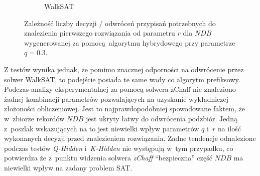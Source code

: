 \begin{figure}[!htb]
\begin{subfigure}{0.5\textwidth}
        \caption{WalkSAT}
        \label{chrt:r-hybrid-w}
    \end{subfigure}
    \caption{Zależność liczby decyzji / odwróceń przypisań potrzebnych do znalezienia pierwszego rozwiązania od parametru $r$ dla $NDB$ wygenerowanej za pomocą algorytmu hybrydowego przy parametrze $q=0.3$.}
\end{figure}

Z testów wynika jednak, że pomimo znacznej odporności na odwrócenie przez solwer WalkSAT, to podejście posiada te same wady co algorytm prefiksowy. Podczas analizy eksperymentalnej za pomocą solwera zChaff
nie znaleziono żadnej kombinacji parametrów pozwalających na uzyskanie wykładniczej złożoności obliczeniowej. Jest to najprawdopodobniej spowodowane faktem, że w~zbiorze rekordów $NDB$ jest ukryty łatwy do odwrócenia podzbiór.
Jedną z~poszlak wskazujących na to jest niewielki wpływ parametrów $q$ i~$r$ na ilość wykonanych decyzji przed znalezieniem rozwiązania. Żadne tendencje odnalezione podczas testów \textit{Q-Hidden} i~\textit{K-Hidden} 
nie występują w~tym przypadku, co potwierdza że z~punktu widzenia solwera \textit{zChaff} \enquote{bezpieczna} część $NDB$ ma niewielki wpływ na zadany problem SAT. 

